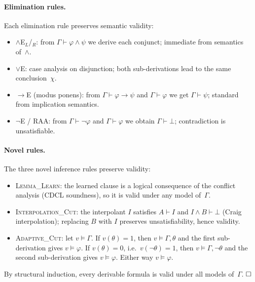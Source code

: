 \documentclass[acmtocl,review,anonymous]{acmart}
\newcommand{\proves}{\vdash}
\begin{document}
\paragraph{Elimination rules.}
Each elimination rule preserves semantic validity:
\begin{itemize}
  \item $\wedge$E$_L$/$_R$: from $\Gamma \proves \varphi \wedge \psi$ we
    derive each conjunct; immediate from semantics of~$\wedge$.

  \item $\vee$E: case analysis on disjunction; both sub-derivations
    lead to the same conclusion~$\chi$.

  \item $\to$E (modus ponens): from $\Gamma \proves \varphi \to \psi$
    and $\Gamma \proves \varphi$ we get $\Gamma \proves \psi$;
    standard from implication semantics.

  \item $\neg$E / RAA: from $\Gamma \proves \neg\varphi$ and
    $\Gamma \proves \varphi$ we obtain $\Gamma \proves \bot$;
    contradiction is unsatisfiable.
\end{itemize}

\paragraph{Novel rules.}
The three novel inference rules preserve validity:
\begin{itemize}
  \item \textsc{Lemma\_Learn}: the learned clause is a logical consequence
    of the conflict analysis (CDCL soundness), so it is valid under
    any model of~$\Gamma$.

  \item \textsc{Interpolation\_Cut}: the interpolant $I$ satisfies
    $A \proves I$ and $I \wedge B \proves \bot$ (Craig interpolation);
    replacing $B$ with $I$ preserves unsatisfiability, hence validity.

  \item \textsc{Adaptive\_Cut}: let $v \models \Gamma$.  If $v(\theta)=1$,
    then $v \models \Gamma, \theta$ and the first sub-derivation gives
    $v \models \varphi$.  If $v(\theta)=0$, i.e.\ $v(\neg\theta)=1$,
    then $v \models \Gamma, \neg\theta$ and the second sub-derivation
    gives $v \models \varphi$.  Either way $v \models \varphi$.
\end{itemize}

By structural induction, every derivable formula is valid under all
models of~$\Gamma$.  $\hfill\square$
\end{document}
